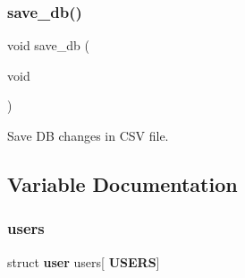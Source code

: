 \subsubsection{save\+\_\+db()}
{\footnotesize\ttfamily void save\+\_\+db (\begin{DoxyParamCaption}\item[{void}]{ }\end{DoxyParamCaption})}



Save DB changes in C\+SV file. 



\subsection{Variable Documentation}
\mbox{\label{auth_8h_ad1b6438b2448da2b01d9887f58f5fb66}} 
\subsubsection{users}
{\footnotesize\ttfamily struct \textbf{ user} users[\textbf{ U\+S\+E\+RS}]}

